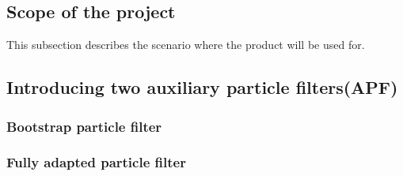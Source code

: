 \documentclass[11pt,oneside,a4paper]{article}
\begin{document}
\subsection{Scope of the project}
This subsection describes the scenario where the product will be used for.

\subsection{Introducing two auxiliary particle filters(APF)}
\subsubsection{Bootstrap particle filter}

\subsubsection{Fully adapted particle filter}
\end{document}
